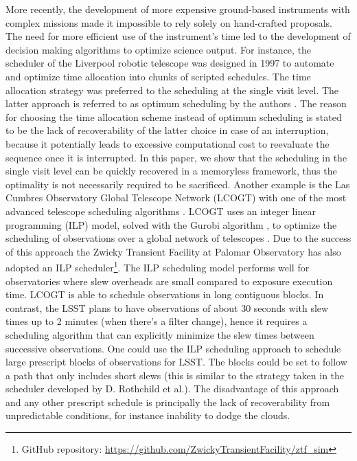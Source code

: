 \documentclass[12pt]{aastex62}
\theoremstyle{definition}
\begin{document}
More recently, the development of more expensive ground-based instruments with complex missions made it impossible to rely solely on hand-crafted proposals. The need for more efficient use of the instrument's time led to the development of decision making algorithms to optimize science output. For instance, the scheduler of the Liverpool robotic telescope was designed in 1997 to automate and optimize time allocation into chunks of scripted schedules. The time allocation strategy was preferred to the scheduling at the single visit level. The latter approach is referred to as optimum scheduling by the authors \citep{steele1997control}. The reason for choosing the time allocation scheme instead of optimum scheduling is stated to be the lack of recoverability of the latter choice in case of an interruption, because it potentially leads to excessive computational cost to reevaluate the sequence once it is interrupted. In this paper, we show that the scheduling in the single visit level can be quickly recovered in a memoryless framework, thus the optimality is not necessarily required to be sacrificed. Another example is the Las Cumbres Observatory Global Telescope Network (LCOGT) with one of the most advanced telescope scheduling algorithms \citep{Boroson14, Saunders14}. LCOGT uses an integer linear programming (ILP) model, solved with the Gurobi algorithm \citep{gurobi}, to optimize the scheduling of observations over a global network of telescopes \citep{Lampoudi15}. Due to the success of this approach the Zwicky Transient Facility at Palomar Observatory \citep{Bellm14} has also adopted an ILP scheduler\footnote{GitHub repository: \url{https://github.com/ZwickyTransientFacility/ztf_sim}}. The ILP scheduling model performs well for observatories where slew overheads are small compared to exposure execution time. LCOGT is able to schedule observations in long contiguous blocks. In contrast, the LSST plans to have observations of about 30 seconds with slew times up to 2 minutes (when there's a filter change), hence it requires a scheduling algorithm that can explicitly minimize the slew times between successive observations. One could use the ILP scheduling approach to schedule large prescript blocks of observations for LSST. The blocks could be set to follow a path that only includes short slews (this is similar to the strategy taken in the scheduler developed by D. Rothchild et al.). The disadvantage of this approach and any other prescript schedule is principally the lack of recoverability from unpredictable conditions, for instance inability to dodge the clouds.
\end{document}
